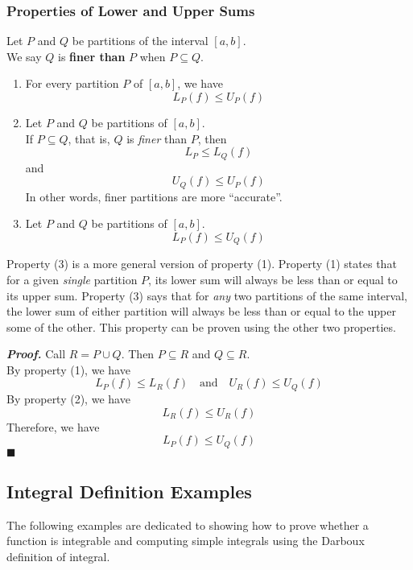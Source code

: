 \documentclass[11pt]{article}
\newenvironment{definition}[1][]{\begin{tcolorbox}[colframe=_orange,colback=_orange2,title=Definition. \ifthenelse{\isempty{#1}}{}{(#1)}
]}{\end{tcolorbox}}
\newcommand{\emptyline}[0]{\\\hfill$~$\\}
\newenvironment{proof}{\par\textit{\textbf{Proof.}}}{\hfill$\blacksquare$}
\begin{document}
\subsubsection{Properties of Lower and Upper Sums}
\begin{definition}[Fine Partitions]
    Let $P$ and $Q$ be partitions of the interval $[a,b]$. \\
    We say $Q$ is \textbf{finer than} $P$ when $P\subseteq Q$.
\end{definition}
\begin{enumerate}
    \item For every partition $P$ of $[a,b]$, we have
          $$
              L_P(f)\leq U_P(f)
          $$
    \item Let $P$ and $Q$ be partitions of $[a,b]$. \\
          If $P\subseteq Q$, that is, $Q$ is \textit{finer} than $P$, then
          $$
              L_P\leq L_Q(f)
          $$
          and
          $$
              U_Q(f)\leq U_P(f)
          $$
          In other words, finer partitions are more ``accurate''.
    \item Let $P$ and $Q$ be partitions of $[a,b]$.
          $$
              L_P(f)\leq U_Q(f)
          $$
\end{enumerate}
Property (3) is a more general version of property (1). Property (1) states that for a given \textit{single} partition $P$, its lower sum will always be less than or equal to its upper sum. Property (3) says that for \textit{any} two partitions of the same interval, the lower sum of either partition will always be less than or equal to the upper some of the other. This property can be proven using the other two properties. \emptyline
\begin{proof}
    Call $R=P\cup Q$. Then $P\subseteq R$ and $Q\subseteq R$. \\
    By property (1), we have
    $$
        L_P(f)\leq L_R(f)\quad\text{and}\quad U_R(f)\leq U_Q(f)
    $$
    By property (2), we have
    $$
        L_R(f)\leq U_R(f)
    $$
    Therefore, we have
    $$
        L_P(f) \leq U_Q(f)
    $$
\end{proof}
\subsection{Integral Definition Examples}
The following examples are dedicated to showing how to prove whether a function is integrable and computing simple integrals using the Darboux definition of integral.
\end{document}
